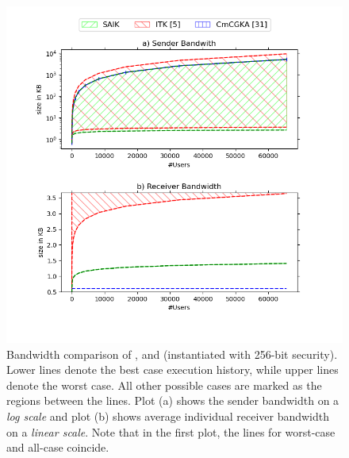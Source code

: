 \begin{figure}[!t]
  \includegraphics[width=\linewidth]{../plots/Final_Figures_Avg}
  \vspace{-3em}
  \caption{Bandwidth comparison of \saik, \protITK and \protCMPKE (instantiated with 256-bit
    security). Lower lines denote the best case execution history, while upper lines denote the
    worst case. All other possible cases are marked as the regions between the lines. Plot (a) shows the sender bandwidth on a \emph{log scale} and plot
    (b) shows average individual receiver bandwidth on a \emph{linear scale}. Note that in the first plot, the lines for worst-case \saik and
    all-case \protCMPKE coincide.\vspace{-1em}}
  \label{fig:plots}
\end{figure}

